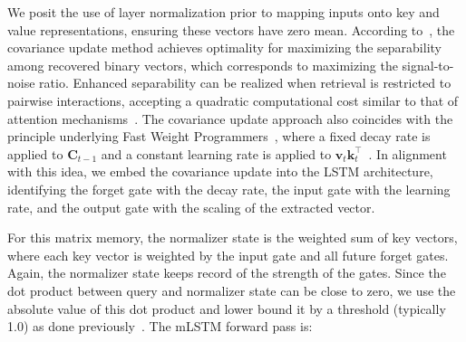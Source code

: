 We posit the use of layer normalization prior to mapping inputs onto key and value representations, ensuring these vectors have zero mean. According to~\citet{Dayan:91}, the covariance update method achieves optimality for maximizing the separability among recovered binary vectors, which corresponds to maximizing the signal-to-noise ratio. Enhanced separability can be realized when retrieval is restricted to pairwise interactions, accepting a quadratic computational cost similar to that of attention mechanisms~\citep{Krotov:16,Krotov:17,Ramsauer:21}. The covariance update approach also coincides with the principle underlying Fast Weight Programmers~\citep{Schmidhuber:92ncfastweights,Schlag:21}, where a fixed decay rate is applied to $\mathbf{C}_{t-1}$ and a constant learning rate is applied to $\mathbf{v}_{t} \mathbf{k}_t ^\top$~\citep{Ba:16}. In alignment with this idea, we embed the covariance update into the LSTM architecture, identifying the forget gate with the decay rate, the input gate with the learning rate, and the output gate with the scaling of the extracted vector.

For this matrix memory, the normalizer state is the weighted sum of key vectors, where each key vector is weighted by the input gate and all future forget gates. Again, the normalizer state keeps record of the strength of the gates. Since the dot product between query and normalizer state can be close to zero, we use the absolute value of this dot product and lower bound it by a threshold (typically 1.0) as done previously~\citep{Sun:23arxiv}. The mLSTM forward pass is:

